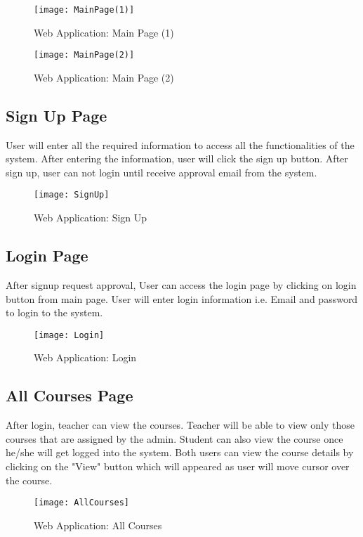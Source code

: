 \begin{figure}[h]
  \centering
  \texttt{[image: MainPage(1)]}
  \caption{Web Application: Main Page (1)}
\end{figure}

\begin{figure}[h]
  \centering
  \texttt{[image: MainPage(2)]}
  \caption{Web Application: Main Page (2)}
\end{figure}

\newpage

\subsection{Sign Up Page}
User will enter all the required information to access all the functionalities of the system. After entering the information, user will click the sign up button. After sign up, user can not login until receive approval email from the system.

\begin{figure}[h]
  \centering
  \texttt{[image: SignUp]}
  \caption{Web Application: Sign Up}
\end{figure}

\subsection{Login Page}
After signup request approval, User can access the login page by clicking on login button from main page.  User will enter login information i.e. Email and password to login to the system.

\begin{figure}[h]
  \centering
  \texttt{[image: Login]}
  \caption{Web Application: Login}
\end{figure}

\subsection{All Courses Page}
After login, teacher can view the courses. Teacher will be able to view only those courses that are assigned by the admin. Student can also view the course once he/she will get logged into the system. Both users can view the course details by clicking on the "View" button which will appeared as user will move cursor over the course.

\begin{figure}[h]
  \centering
  \texttt{[image: AllCourses]}
  \caption{Web Application: All Courses}
\end{figure}

